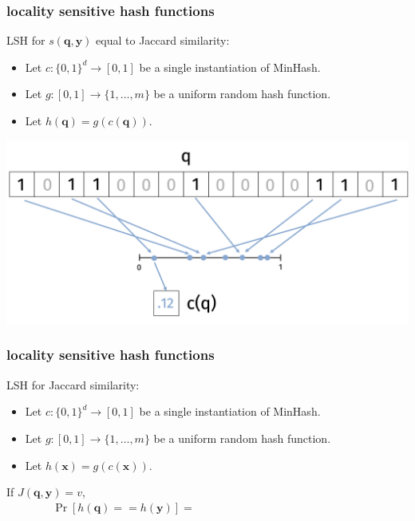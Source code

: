 \documentclass[compress]{beamer}
\newcommand{\bv}[1]{\mathbf{#1}}
\begin{document}
\begin{frame}
	\frametitle{locality sensitive hash functions}
	LSH for $s(\bv{q},\bv{y})$  equal to Jaccard similarity:
	\begin{itemize}
		\item Let $c: \{0,1\}^d \rightarrow [0,1]$ be a single instantiation of MinHash.
		\item Let $g: [0,1] \rightarrow \{1, \ldots, m\}$ be a uniform random hash function.
		\item Let $h(\bv{q}) = g(c(\bv{q})).$
	\end{itemize}
\begin{center}
	\includegraphics[width=.7\textwidth]{single_min_hash.png}
\end{center}

\end{frame}

\begin{frame}
	\frametitle{locality sensitive hash functions}
	LSH for Jaccard similarity:
	\begin{itemize}
		\item Let $c: \{0,1\}^d \rightarrow [0,1]$ be a single instantiation of MinHash.
		\item Let $g: [0,1] \rightarrow \{1, \ldots, m\}$ be a uniform random hash function.
		\item Let $h(\bv{x}) = g(c(\bv{x})).$
	\end{itemize}
		If $J(\bv{q},\bv{y}) = v$, 
		\begin{align*}
			\Pr\left[h(\bv{q}) == h(\bv{y})\right] = \hspace{15em}
		\end{align*}
\end{frame}
\end{document}
